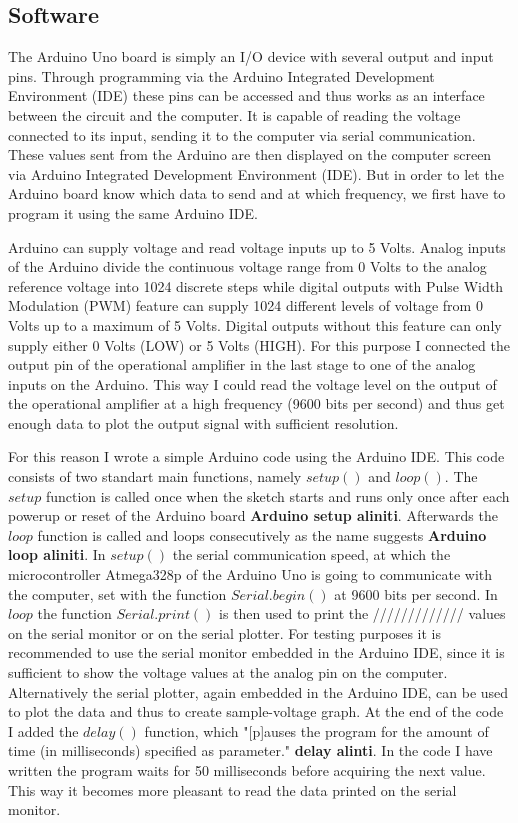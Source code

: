 \subsection{Software}
The Arduino Uno board is simply an I/O device with several output and input pins. Through programming via the Arduino Integrated Development Environment (IDE) these pins can be accessed and thus works as an interface between the circuit and the computer. It is capable of reading the voltage connected to its input, sending it to the computer via serial communication. These values sent from the Arduino are then displayed on the computer screen via Arduino Integrated Development Environment (IDE). But in order to let the Arduino board know which data to send and at which frequency, we first have to program it using the same Arduino IDE.\par
Arduino can supply voltage and read voltage inputs up to 5 Volts. Analog inputs of the Arduino divide the continuous voltage range from 0 Volts to the analog reference voltage into 1024 discrete steps while digital outputs with Pulse Width Modulation (PWM) feature can supply 1024 different levels of voltage from 0 Volts up to a maximum of 5 Volts. Digital outputs without this feature can only supply either 0 Volts (LOW) or 5 Volts (HIGH). For this purpose I connected the output pin of the operational amplifier in the last stage to one of the analog inputs on the Arduino. This way I could read the voltage level on the output of the operational amplifier at a high frequency (9600 bits per second) and thus get enough data to plot the output signal with sufficient resolution. \par
For this reason I wrote a simple Arduino code using the Arduino IDE. This code consists of two standart main functions, namely $setup()$ and $loop()$. The $setup$ function is called once when the sketch starts and runs only once after each powerup or reset of the Arduino board \textbf{Arduino setup aliniti}. Afterwards the $loop$ function is called and loops consecutively as the name suggests \textbf{Arduino loop aliniti}. In $setup()$ the serial communication speed, at which the microcontroller Atmega328p of the Arduino Uno is going to communicate with the computer, set with the function $Serial.begin()$ at 9600 bits per second. In $loop$ the function $Serial.print()$ is then used to print the ///////////// values on the serial monitor or on the serial plotter. For testing purposes it is recommended to use the serial monitor embedded in the Arduino IDE, since it is sufficient to show the voltage values at the analog pin on the computer. Alternatively the serial plotter, again embedded in the Arduino IDE, can be used to plot the data and thus to create sample-voltage graph. At the end of the code I added the $delay()$ function, which "[p]auses the program for the amount of time (in milliseconds) specified as parameter." \textbf{delay alinti}. In the code I have written the program waits for 50 milliseconds before acquiring the next value. This way it becomes more pleasant to read the data printed on the serial monitor.

